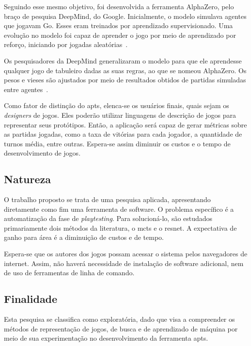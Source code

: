 \documentclass[12pt]{article}
\begin{document}
Seguindo esse mesmo objetivo, foi desenvolvida a ferramenta AlphaZero, pelo braço de pesquisa DeepMind, do Google.
Inicialmente, o modelo simulava agentes que jogavam Go.
Esses eram treinados por aprendizado supervisionado.
Uma evolução no modelo foi capaz de aprender o jogo por meio de aprendizado por reforço, iniciando por jogadas aleatórias~\cite{silverMasteringGameGo2016}.

Os pesquisadores da DeepMind generalizaram o modelo para que ele aprendesse qualquer jogo de tabuleiro dadas as suas regras, ao que se nomeou AlphaZero.
Os pesos e vieses são ajustados por meio de resultados obtidos de partidas simuladas entre agentes~\cite{alphazero-deepmind, silverGeneralReinforcementLearning2018}.

Como fator de distinção do \gls{apts}, elenca-se os usuários finais, quais sejam os \textit{designers} de jogos.
Eles poderão utilizar linguagens de descrição de jogos para representar seus protótipos.
Então, a aplicação será capaz de gerar métricas sobre as partidas jogadas, como a taxa de vitórias para cada jogador, a quantidade de turnos média, entre outras.
Espera-se assim diminuir os custos e o tempo de desenvolvimento de jogos.

\subsection{Natureza}

O trabalho proposto se trata de uma pesquisa aplicada, apresentando diretamente como fim uma ferramenta de software.
O problema específico é a automatização da fase de \textit{playtesting}.
Para solucioná-lo, são estudados primariamente dois métodos da literatura, o \gls{mcts} e o \gls{resnet}.
A expectativa de ganho para área é a diminuição de custos e de tempo.

Espera-se que os autores dos jogos possam acessar o sistema pelos navegadores de internet.
Assim, não haverá necessidade de instalação de software adicional, nem de uso de ferramentas de linha de comando.

\subsection{Finalidade}

Esta pesquisa se classifica como exploratória, dado que visa a compreender os métodos de representação de jogos, de busca e de aprendizado de máquina por meio de sua experimentação no desenvolvimento da ferramenta \gls{apts}.
\end{document}
